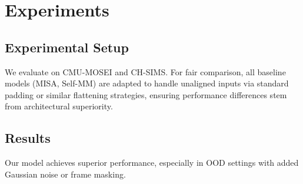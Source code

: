 \documentclass{article}
\begin{document}
\section{Experiments}
\subsection{Experimental Setup}
We evaluate on CMU-MOSEI and CH-SIMS. For fair comparison, all baseline models (MISA, Self-MM) are adapted to handle unaligned inputs via standard padding or similar flattening strategies, ensuring performance differences stem from architectural superiority.

\subsection{Results}
Our model achieves superior performance, especially in OOD settings with added Gaussian noise or frame masking.
\end{document}
